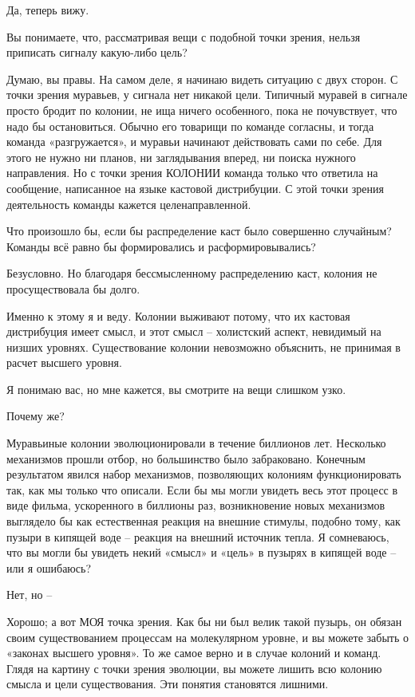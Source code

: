 \documentclass[../main.tex]{subfiles}
\begin{document}
\begin{dialogue}
 Да, теперь вижу.

 Вы понимаете, что, рассматривая вещи с подобной точки зрения, нельзя приписать сигналу какую-либо цель?

 Думаю, вы правы. На самом деле, я начинаю видеть ситуацию с двух сторон. С точки зрения муравьев, у сигнала нет никакой цели. Типичный муравей в сигнале просто бродит по колонии, не ища ничего особенного, пока не почувствует, что надо бы остановиться. Обычно его товарищи по команде согласны, и тогда команда «разгружается», и муравьи начинают действовать сами по себе. Для этого не нужно ни планов, ни заглядывания вперед, ни поиска нужного направления. Но с точки зрения КОЛОНИИ команда только что ответила на сообщение, написанное на языке кастовой дистрибуции. С этой точки зрения деятельность команды кажется целенаправленной.

 Что произошло бы, если бы распределение каст было совершенно случайным? Команды всё равно бы формировались и расформировывались?

 Безусловно. Но благодаря бессмысленному распределению каст, колония не просуществовала бы долго.

 Именно к этому я и веду. Колонии выживают потому, что их кастовая дистрибуция имеет смысл, и этот смысл \--- холистский аспект, невидимый на низших уровнях. Существование колонии невозможно объяснить, не принимая в расчет высшего уровня.

 Я понимаю вас, но мне кажется, вы смотрите на вещи слишком узко.

 Почему же?

 Муравьиные колонии эволюционировали в течение биллионов лет. Несколько механизмов прошли отбор, но большинство было забраковано. Конечным результатом явился набор механизмов, позволяющих колониям функционировать так, как мы только что описали. Если бы мы могли увидеть весь этот процесс в виде фильма, ускоренного в биллионы раз, возникновение новых механизмов выглядело бы как естественная реакция на внешние стимулы, подобно тому, как пузыри в кипящей воде \--- реакция на внешний источник тепла. Я сомневаюсь, что вы могли бы увидеть некий «смысл» и «цель» в пузырях в кипящей воде \--- или я ошибаюсь?

 Нет, но \---

 Хорошо; а вот МОЯ точка зрения. Как бы ни был велик такой пузырь, он обязан своим существованием процессам на молекулярном уровне, и вы можете забыть о «законах высшего уровня». То же самое верно и в случае колоний и команд. Глядя на картину с точки зрения эволюции, вы можете лишить всю колонию смысла и цели существования. Эти понятия становятся лишними.


\end{dialogue}
\end{document}

